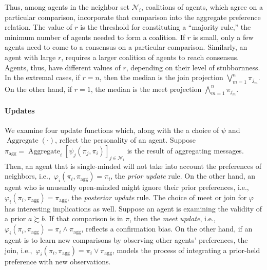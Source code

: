 \documentclass[conference]{ieeeconf}
\newcommand{\N}{\mathcal{N}}
\newcommand{\prefers}{\succsim}
\newcommand{\join}{\vee}
\newcommand{\meet}{\wedge}
\newcommand{\bigjoin}{\bigvee}
\newcommand{\bigmeet}{\bigwedge}
\DeclareMathOperator{\Aggregate}{Aggregate}
\DeclareMathOperator{\Median}{Median}
\begin{document}

Thus, among agents in the neighbor set $\N_i$, coalitions of agents, which agree on a particular comparison, incorporate that comparison into the aggregate preference relation. The value of $r$ is the threshold for constituting a ``majority rule,'' the minimum number of agents needed to form a coalition.
If $r$ is small, only a few agents need to come to a consensus on a particular comparison. Similarly, an agent with large $r$, requires a larger coalition of agents to reach consensus. Agents, thus, have different values of $r$, depending on their level of stubbornness. In the extremal cases, if $r= n$, then the median is the join projection $\bigjoin_{m=1}^n \pi_{j_m}$. On the other hand, if $r=1$, the median is the meet projection $\bigmeet_{m=1}^n \pi_{j_m}$. 

\paragraph{Updates}
We examine four update functions which, along with the a choice of $\psi$ and $\Aggregate(\cdot)$, reflect the personality of an agent. Suppose $\pi_{\mathrm{agg}} = \Aggregate_i\left[\psi_j(\pi_j,\pi_i)\right]_{j \in \N_i}$ is the result of aggregating messages. Then, an agent that is single-minded will not take into account the preferences of neighbors, i.e.,~$\varphi_i(\pi_i,\pi_{\mathrm{agg}}) = \pi_i$, the \emph{prior update} rule. On the other hand, an agent who is unusually open-minded might ignore their prior preferences, i.e.,~$\varphi_i(\pi_i,\pi_{\mathrm{agg}}) = \pi_{\mathrm{agg}}$, the \emph{posterior update} rule. The choice of meet or join for $\varphi$ has interesting implications as well. Suppose an agent is examining the validity of a prior $a \prefers b$. If that comparison is in $\pi$, then the \emph{meet update}, i.e.,~$\varphi_i(\pi_i,\pi_{\mathrm{agg}}) = \pi_i \meet \pi_{\mathrm{agg}}$, reflects a confirmation bias.
On the other hand, if an agent is to learn new comparisons by observing other agents' preferences, the join, i.e.,~$\varphi_i(\pi_i,\pi_{\mathrm{agg}}) = \pi_i \join \pi_{\mathrm{agg}}$, models the process of integrating a prior-held preference with new observations.
\end{document}
